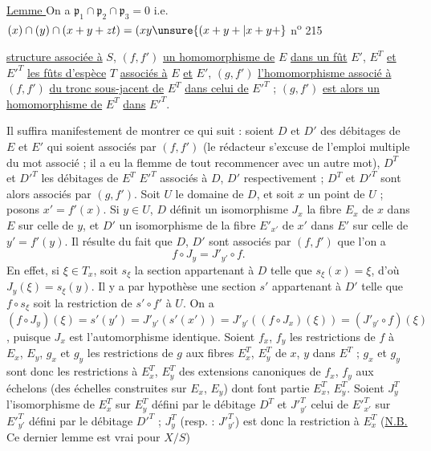 \uline{Lemme } On a $\mathfrak p_1\cap\mathfrak p_2\cap\mathfrak p_3=0$ i.e. $(x)\cap(y)\cap(x+y+zt)=(xy\unsure{(x+y+|x+y+}$
n\textsuperscript{o} 215

\uline{structure associée à} $S$, $(f,f')$ \uline{un homomorphisme de} $E$ \uline{dans un fût} $E'$, $E^T$ \uline{et} ${E'}^T$ \uline{les fûts d'espèce} $T$ \uline{associés à} $E$ \uline{et} $E'$, $(g,f')$ \uline{l'homomorphisme associé à} $(f,f')$ \uline{du tronc sous-jacent de} $E^T$ \uline{dans celui de} ${E'}^T$ ; $(g,f')$ \uline{est alors un homomorphisme de} $E^T$ \uline{dans} ${E'}^T$.

Il suffira manifestement de montrer ce qui suit : soient $D$ et $D'$ des débitages de $E$ et $E'$ qui soient associés par $(f,f')$ (le rédacteur s'excuse de l'emploi multiple du mot  associé ; il a eu la flemme de tout recommencer avec un autre mot), $D^T$ et ${D'}^T$ les débitages de $E^T$  ${E'}^T$ associés à $D$, $D'$ respectivement ; $D^T$ et ${D'}^T$ sont alors associés par $(g,f')$. Soit $U$ le domaine de $D$, et soit $x$ un point de $U$ ; posons $x'=f'(x)$. Si $y\in U$, $D$ définit un isomorphisme $J_x$  la fibre $E_x$ de $x$ dans $E$ sur celle de $y$, et $D'$ un isomorphisme de la fibre $E'_{x'}$ de $x'$ dans $E'$ sur celle de $y'=f'(y)$. Il résulte du fait que $D$, $D'$ sont associés par $(f,f')$ que l'on a
\[
f\circ J_y=J'_{y'}\circ f.
\]
En effet, si $\xi\in T_x$, soit $s_\xi$ la section appartenant à $D$ telle que $s_\xi(x)=\xi$, d'où $J_y(\xi)=s_\xi(y)$. Il y a par hypothèse une section $s'$ appartenant à $D'$ telle que $f\circ s_\xi$ soit la restriction de $s'\circ f'$ à $U$. On a $(f\circ J_y)(\xi)=s'(y')=J'_{y'}(s'(x'))=J'_{y'}((f\circ J_x)(\xi))=(J'_{y'}\circ f)(\xi)$, puisque $J_x$ est l'automorphisme identique. Soient $f_x$, $f_y$ les restrictions de $f$ à $E_x$, $E_y$, $g_x$ et $g_y$ les restrictions de $g$ aux fibres $E_x^T$, $E_y^T$ de $x$, $y$ dans $E^T$ ; $g_x$ et $g_y$ sont donc les restrictions à $E_x^T$, $E_y^T$ des extensions canoniques de $f_x$, $f_y$ aux échelons (des échelles construites sur $E_x$, $E_y$) dont font partie $E_x^T$, $E_y^T$. Soient $J_y^T$ l'isomorphisme de $E_x^T$ sur $E_y^T$ défini par le débitage $D^T$ et ${J'}^{T}_{y'}$ celui de ${E'}^{T}_{x'}$ sur ${E'}^{T}_{y'}$ défini par le débitage ${D'}^T$ ; $J_y^T$ (resp. : ${J'}^{T}_{y'}$) est donc la restriction à $E_x^T$
(\uline{N.B.} Ce dernier lemme est vrai pour $X/S$)

